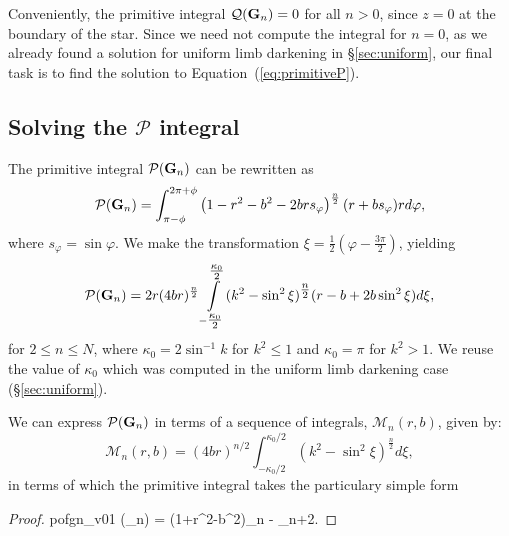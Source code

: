 \documentclass[modern]{aastex61}
\begin{document}
Conveniently, the primitive integral $\mathcal{Q}({\mathbf{G}}_n) = 0$ for
all $n > 0$, since $z=0$ at the boundary of the star. 
Since we need not compute the integral for $n=0$, as we already
found a solution for uniform limb darkening in \S\ref{sec:uniform},
our final task is to find the solution to Equation~(\ref{eq:primitiveP}).

\subsection{Solving the $\mathcal{P}$ integral}
\label{sec:Pintegral}

The primitive integral
$\mathcal{P}({\mathbf{G}}_n)$ can be rewritten as
\begin{equation}
\mathcal{P}(\bvec{G}_n) =
\int_{\pi-\phi}^{2\pi + \phi} \left(1-r^2-b^2-2br s_\varphi\right)^{\frac{n}{2}} (r+b s_\varphi) r d\varphi,
\end{equation}
where $s_\varphi = \sin{\varphi}$.
We make the transformation $\xi = \tfrac{1}{2} \left(\varphi - \tfrac{3\pi}{2}\right)$, yielding
\begin{equation}\label{eq:greens_transformed}
\mathcal{P}(\bvec{G}_n) =
2r (4br)^{\frac{n}{2}}\int\displaylimits_{-\tfrac{\kappa_0}{2}}^{\tfrac{\kappa_0}{2}}
(k^2-\sin^2\xi)^{\tfrac{n}{2}} (r-b + 2b \sin^2 \xi) d\xi,
\end{equation}
for $2 \le n \le N$, where $\kappa_0 = 2 \sin^{-1}k$ for $k^2 \le 1$ and
$\kappa_0 = \pi$ for $k^2 > 1$.  We
reuse the value of $\kappa_0$ which was computed in the uniform limb darkening
case (\S \ref{sec:uniform}).


We can express $\mathcal{P}({\mathbf{G}}_n)$ in terms of a sequence of integrals,
$\mathcal{M}_n(r,b)$, given by:
\begin{equation}\label{eq:M_of_n}
\mathcal{M}_n(r,b) = (4br)^{n/2} \int_{-\kappa_0/2}^{\kappa_0/2} (k^2-\sin^2\xi)^{\tfrac{n}{2}} d\xi,
\end{equation}
in terms of which the primitive integral takes the particulary simple form
\begin{proof}{pofgn_v01}\label{eq:primitive}
(_n) = (1+r^2-b^2)_n - _{n+2}.
\end{proof}
\end{document}
